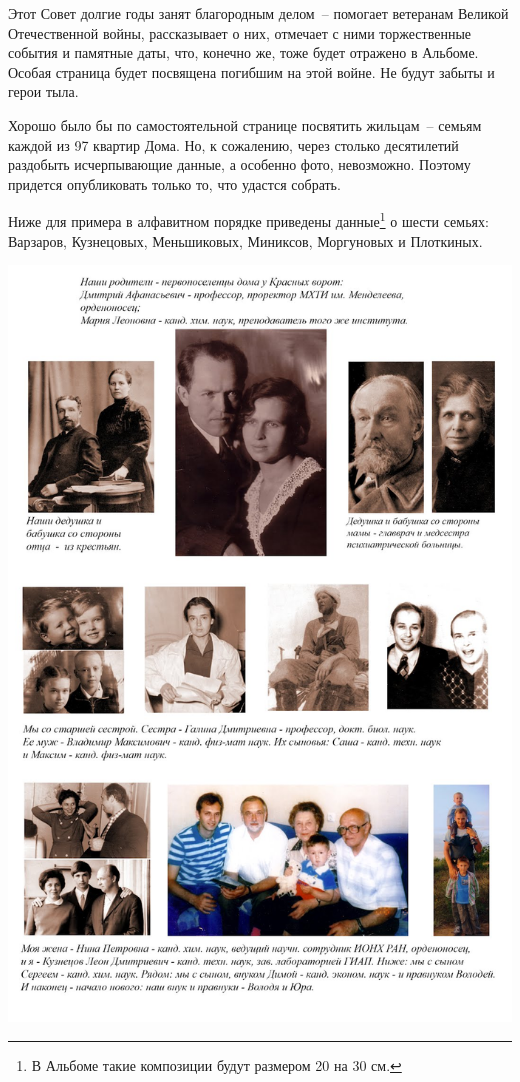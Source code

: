 Этот Совет долгие годы занят благородным делом~-- помогает ветеранам Великой Отечественной войны, рассказывает о них, отмечает с ними торжественные события и памятные даты, что, конечно же, тоже будет отражено в Альбоме. Особая страница будет посвящена погибшим на этой войне. Не будут забыты и герои тыла.

Хорошо было бы по самостоятельной странице посвятить жильцам~-- семьям каждой из 97 квартир Дома. Но, к сожалению, через столько десятилетий раздобыть исчерпывающие данные, а особенно фото, невозможно.
Поэтому придется опубликовать только то, что удастся собрать. 

Ниже для примера в алфавитном порядке приведены данные\footnote{В Альбоме такие композиции будут размером 20 на 30 см.} о шести семьях: Варзаров, Кузнецовых, Меньшиковых, Миниксов, Моргуновых и Плоткиных.





\noindent
\includegraphics[height=\paperheight]{inc/kuznecovy}



